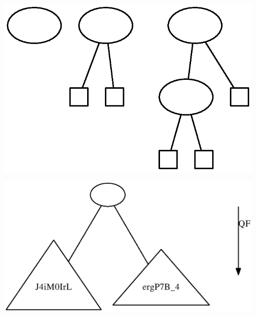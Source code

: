 \documentclass[english]{article}
\begin{document}

\includegraphics{kap3Mindestknotenzahl1.la.dot.ps}


\includegraphics{kap3Mindestknotenzahl2.la.dot.ps}
\end{document}

